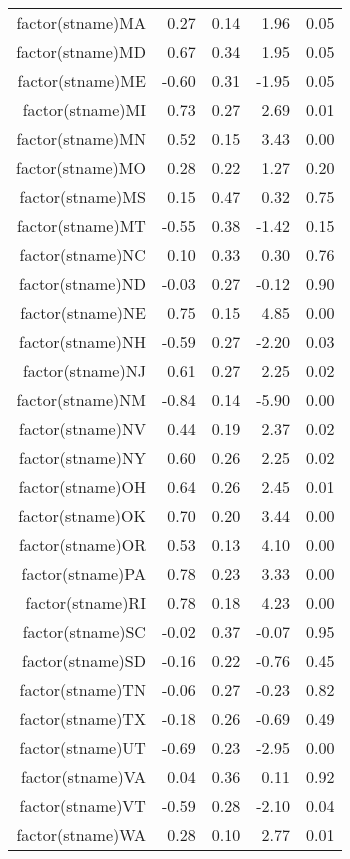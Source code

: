\begin{table}[ht]
\begin{tabular}{rrrrr}
  factor(stname)MA & 0.27 & 0.14 & 1.96 & 0.05 \\ 
  factor(stname)MD & 0.67 & 0.34 & 1.95 & 0.05 \\ 
  factor(stname)ME & -0.60 & 0.31 & -1.95 & 0.05 \\ 
  factor(stname)MI & 0.73 & 0.27 & 2.69 & 0.01 \\ 
  factor(stname)MN & 0.52 & 0.15 & 3.43 & 0.00 \\ 
  factor(stname)MO & 0.28 & 0.22 & 1.27 & 0.20 \\ 
  factor(stname)MS & 0.15 & 0.47 & 0.32 & 0.75 \\ 
  factor(stname)MT & -0.55 & 0.38 & -1.42 & 0.15 \\ 
  factor(stname)NC & 0.10 & 0.33 & 0.30 & 0.76 \\ 
  factor(stname)ND & -0.03 & 0.27 & -0.12 & 0.90 \\ 
  factor(stname)NE & 0.75 & 0.15 & 4.85 & 0.00 \\ 
  factor(stname)NH & -0.59 & 0.27 & -2.20 & 0.03 \\ 
  factor(stname)NJ & 0.61 & 0.27 & 2.25 & 0.02 \\ 
  factor(stname)NM & -0.84 & 0.14 & -5.90 & 0.00 \\ 
  factor(stname)NV & 0.44 & 0.19 & 2.37 & 0.02 \\ 
  factor(stname)NY & 0.60 & 0.26 & 2.25 & 0.02 \\ 
  factor(stname)OH & 0.64 & 0.26 & 2.45 & 0.01 \\ 
  factor(stname)OK & 0.70 & 0.20 & 3.44 & 0.00 \\ 
  factor(stname)OR & 0.53 & 0.13 & 4.10 & 0.00 \\ 
  factor(stname)PA & 0.78 & 0.23 & 3.33 & 0.00 \\ 
  factor(stname)RI & 0.78 & 0.18 & 4.23 & 0.00 \\ 
  factor(stname)SC & -0.02 & 0.37 & -0.07 & 0.95 \\ 
  factor(stname)SD & -0.16 & 0.22 & -0.76 & 0.45 \\ 
  factor(stname)TN & -0.06 & 0.27 & -0.23 & 0.82 \\ 
  factor(stname)TX & -0.18 & 0.26 & -0.69 & 0.49 \\ 
  factor(stname)UT & -0.69 & 0.23 & -2.95 & 0.00 \\ 
  factor(stname)VA & 0.04 & 0.36 & 0.11 & 0.92 \\ 
  factor(stname)VT & -0.59 & 0.28 & -2.10 & 0.04 \\ 
  factor(stname)WA & 0.28 & 0.10 & 2.77 & 0.01 \\ 

\end{tabular}
\end{table}

